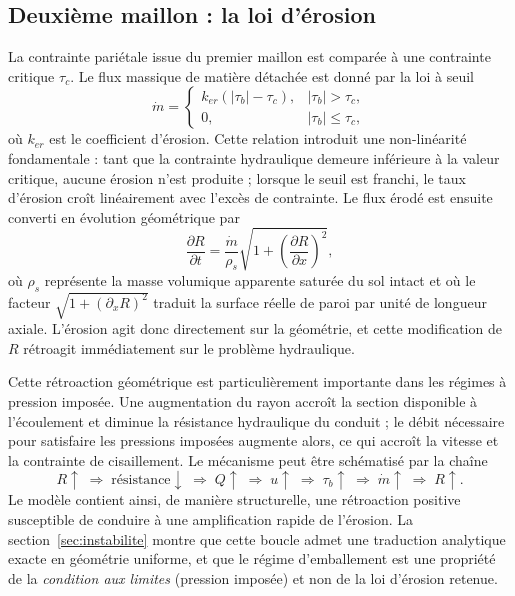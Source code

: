 \documentclass[11pt,a4paper]{report}
\newcommand{\mdot}{\dot{m}}
\begin{document}
\subsection{Deuxième maillon : la loi d'érosion}

La contrainte pariétale issue du premier maillon est comparée à une contrainte critique \(\tau_c\). Le flux
massique de matière détachée est donné par la loi à seuil
\begin{equation}
\mdot =
\begin{cases}
k_{er}\left(|\tau_b| - \tau_c\right), & |\tau_b| > \tau_c,\\[2mm]
0, & |\tau_b| \le \tau_c,
\end{cases}
\label{eq:erosion}
\end{equation}
où \(k_{er}\) est le coefficient d'érosion. Cette relation introduit une non-linéarité fondamentale :
tant que la contrainte hydraulique demeure inférieure à la valeur critique, aucune érosion n'est produite ;
lorsque le seuil est franchi, le taux d'érosion croît linéairement avec l'excès de contrainte. Le flux
érodé est ensuite converti en évolution géométrique par
\begin{equation}
\frac{\partial R}{\partial t} = \frac{\mdot}{\rho_s}\sqrt{1+\left(\frac{\partial R}{\partial x}\right)^2},
\label{eq:dRdt}
\end{equation}
où \(\rho_s\) représente la masse volumique apparente saturée du sol intact et où le facteur
\(\sqrt{1+(\partial_x R)^2}\) traduit la surface réelle de paroi par unité de longueur axiale. L'érosion
agit donc directement sur la géométrie, et cette modification de \(R\) rétroagit immédiatement sur le
problème hydraulique.

Cette rétroaction géométrique est particulièrement importante dans les régimes à pression imposée. Une
augmentation du rayon accroît la section disponible à l'écoulement et diminue la résistance hydraulique
du conduit ; le débit nécessaire pour satisfaire les pressions imposées augmente alors, ce qui accroît la
vitesse et la contrainte de cisaillement. Le mécanisme peut être schématisé par la chaîne
\begin{equation}
R \uparrow \;\Rightarrow\; \text{résistance} \downarrow \;\Rightarrow\; Q \uparrow \;\Rightarrow\;
u \uparrow \;\Rightarrow\; \tau_b \uparrow \;\Rightarrow\; \mdot \uparrow \;\Rightarrow\; R \uparrow .
\label{eq:retro-positive}
\end{equation}
Le modèle contient ainsi, de manière structurelle, une rétroaction positive susceptible de conduire à une
amplification rapide de l'érosion. La section~\ref{sec:instabilite} montre que cette boucle admet une
traduction analytique exacte en géométrie uniforme, et que le régime d'emballement est une propriété de la
\emph{condition aux limites} (pression imposée) et non de la loi d'érosion retenue.
\end{document}
